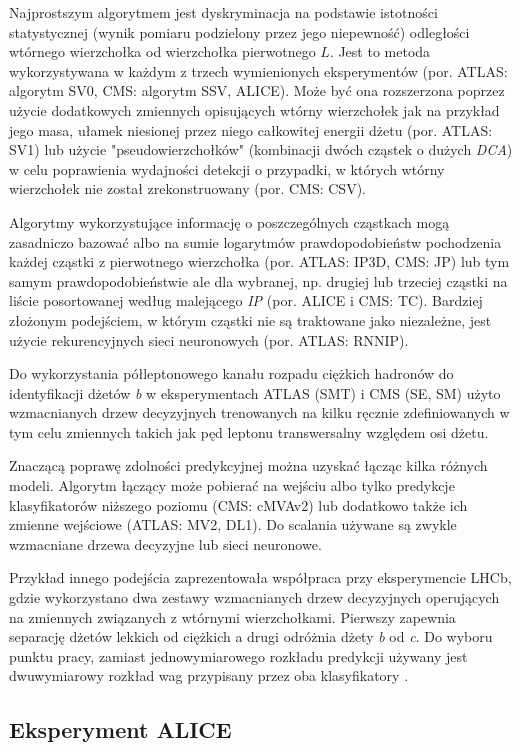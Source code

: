 Najprostszym algorytmem jest dyskryminacja na podstawie istotności statystycznej (wynik pomiaru podzielony przez jego niepewność) odległości wtórnego wierzchołka od wierzchołka pierwotnego $L$. Jest to metoda wykorzystywana w  każdym z trzech wymienionych eksperymentów (por. ATLAS: algorytm SV0, CMS: algorytm SSV, ALICE). 
Może być ona rozszerzona poprzez użycie dodatkowych zmiennych opisujących wtórny wierzchołek jak na przykład jego masa, ułamek niesionej przez niego całkowitej energii dżetu (por. ATLAS: SV1) lub użycie "pseudowierzchołków" (kombinacji dwóch cząstek o dużych \textit{DCA}) w celu poprawienia wydajności detekcji o przypadki, w których wtórny wierzchołek nie został zrekonstruowany (por. CMS: CSV).

Algorytmy wykorzystujące informację o poszczególnych cząstkach mogą zasadniczo bazować albo na sumie logarytmów prawdopodobieństw pochodzenia każdej cząstki z pierwotnego wierzchołka (por. ATLAS: IP3D, CMS: JP) lub tym samym prawdopodobieństwie ale dla wybranej, np. drugiej lub trzeciej cząstki na liście posortowanej według malejącego \textit{IP} (por. ALICE i CMS: TC). Bardziej złożonym podejściem, w którym cząstki nie są traktowane jako niezależne, jest użycie rekurencyjnych sieci neuronowych (por. ATLAS: RNNIP).

Do wykorzystania półleptonowego kanału rozpadu ciężkich hadronów do identyfikacji dżetów \textit{b} w eksperymentach ATLAS (SMT) i CMS (SE, SM) użyto wzmacnianych drzew decyzyjnych trenowanych na kilku ręcznie zdefiniowanych w tym celu zmiennych takich jak pęd leptonu transwersalny względem osi dżetu.

Znaczącą poprawę zdolności predykcyjnej można uzyskać łącząc kilka różnych modeli. 
Algorytm łączący może pobierać na wejściu albo tylko predykcje klasyfikatorów niższego poziomu (CMS: cMVAv2) lub dodatkowo także ich zmienne wejściowe (ATLAS: MV2, DL1). Do scalania używane są zwykle wzmacniane drzewa decyzyjne lub sieci neuronowe.

Przykład innego podejścia zaprezentowała współpraca przy eksperymencie LHCb, gdzie wykorzystano dwa zestawy wzmacnianych drzew decyzyjnych operujących na zmiennych związanych z wtórnymi wierzchołkami. Pierwszy zapewnia separację dżetów lekkich od ciężkich a drugi odróżnia dżety \textit{b} od \textit{c}. 
Do wyboru punktu pracy, zamiast jednowymiarowego rozkładu predykcji używany jest dwuwymiarowy rozkład wag przypisany przez oba klasyfikatory \cite{Aaij:2015yqa}.


\subsection{Eksperyment ALICE}

